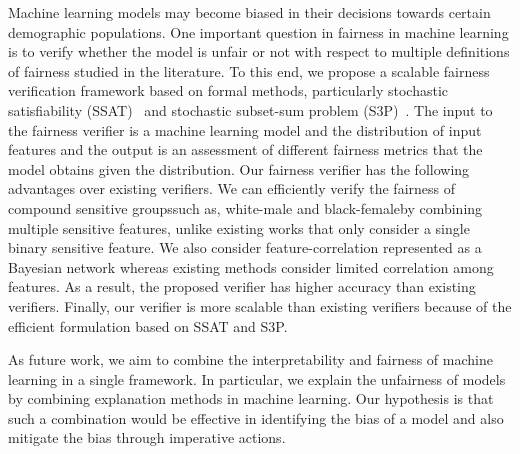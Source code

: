 Machine learning models may become biased in their decisions towards certain demographic populations. One important question in fairness in machine learning is to verify whether the model is unfair or not with respect to multiple definitions of fairness studied in the literature. To this end, we propose a scalable fairness verification framework based on formal methods, particularly stochastic satisfiability (SSAT)~\cite{ghosh2020justicia} and stochastic subset-sum problem (S3P)~\cite{ghosh2021algorithmic}. The input to the fairness verifier is a machine learning model and the distribution of input features and the output is an assessment of different fairness metrics that the model obtains given the distribution. Our fairness verifier has the following advantages over existing verifiers. We can efficiently verify the fairness of compound sensitive groups\textemdash such as, white-male and black-female\textemdash by combining multiple sensitive features, unlike existing works that only consider a single binary sensitive feature. We also consider feature-correlation represented as a Bayesian network whereas existing methods consider limited correlation among features. As a result, the proposed verifier has higher accuracy than existing verifiers. Finally, our verifier is more scalable than existing verifiers because of the efficient formulation based on SSAT and S3P. 


As future work, we aim to combine the interpretability and fairness of machine learning in a single framework. In particular, we explain the unfairness of models by combining explanation methods in machine learning. Our hypothesis is that such a combination would be effective in identifying the bias of a model and also mitigate the bias through imperative actions.
